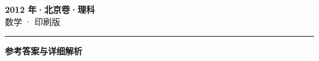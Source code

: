 \documentclass[zihao=5, a4paper]{ctexart}
\begin{document}
\begin{center}
  {\Large\bfseries 2012 年·北京卷·理科}\\[4pt]
  {\large 数学 · 印刷版}
\end{center}
\medskip
{}

\par\bigskip\hrule\bigskip
{}
\Needspace{0.55\textheight}
\begin{center}{\large\bfseries 参考答案与详细解析}\end{center}
\smallskip

\end{document}
